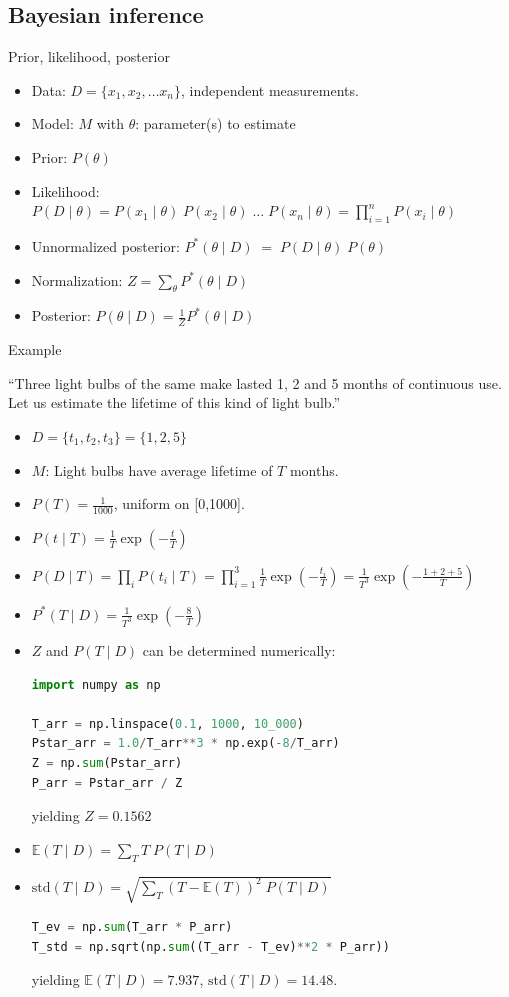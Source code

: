 \subsection{Bayesian inference}
\no Prior, likelihood, posterior
\begin{itemize}
	\item Data: $D = \{x_1, x_2, \ldots x_n\}$, independent measurements.
	\item Model: $M$ with $\theta$: parameter(s) to estimate
	\item Prior: $P(\theta)$
	\item Likelihood: $P(D\;|\;\theta) = P(x_1\;|\;\theta) \;P(x_2\;|\;\theta)\;\ldots \;P(x_n\;|\;\theta) = \prod_{i=1}^n P(x_i\;|\;\theta)$
	\item Unnormalized posterior: $P^\ast(\theta\;|\;D) \;=\; P(D\;|\;\theta) \;P(\theta)$
	\item Normalization: $Z = \sum_\theta P^\ast(\theta\;|\;D)$
	\item Posterior: $P(\theta\;|\;D) = \frac{1}{Z} P^\ast(\theta\;|\;D)$
\end{itemize}
Example

``Three light bulbs of the same make lasted 1, 2 and 5 months of continuous use. Let us estimate the lifetime of this kind of light bulb.''
\begin{itemize}
	\item $D = \{t_1, t_2, t_3\} = \{1,2,5\}$
	\item $M$: Light bulbs have average lifetime of $T$ months.
	\item $P(T) = \frac{1}{1000}$, uniform on [0,1000].
	\item $P(t\;|\;T) = \frac{1}{T}\exp\left(-\frac{t}{T}\right)$
	\item $P(D\;|\;T) = \prod_i P(t_i\;|\; T) = \prod_{i=1}^3 \frac{1}{T}\exp\left(-\frac{t_i}{T}\right) = \frac{1}{T^3} \exp\left(-\frac{1 + 2 + 5}{T}\right)$
	\item $P^\ast(T\;|\;D) = \frac{1}{T^3} \exp\left(-\frac{8}{T}\right)$
	\item $Z$ and  $P(T\;|\;D)$ can be determined numerically:
\begin{lstlisting}[language=python]
import numpy as np

T_arr = np.linspace(0.1, 1000, 10_000)
Pstar_arr = 1.0/T_arr**3 * np.exp(-8/T_arr)
Z = np.sum(Pstar_arr)
P_arr = Pstar_arr / Z
\end{lstlisting}
	yielding $Z = 0.1562$
	\item $\mathbb{E}(T\;|\;D) = \sum_T T \;P(T\;|\;D)$ 
	\item $\text{std}(T\;|\;D) = \sqrt{\sum_T (T - \mathbb{E}(T))^2 \; P(T\;|\;D)}$
\begin{lstlisting}[language=python]
T_ev = np.sum(T_arr * P_arr)
T_std = np.sqrt(np.sum((T_arr - T_ev)**2 * P_arr))
\end{lstlisting}
	yielding $\mathbb{E}(T\;|\;D) = 7.937$, \quad $\text{std}(T\;|\;D) = 14.48$.
\end{itemize}


